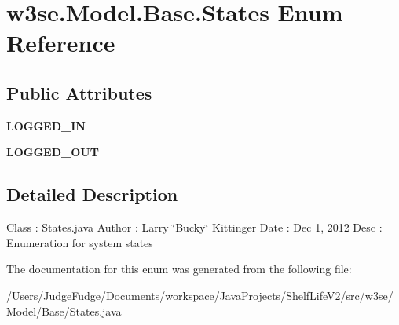 \hypertarget{enumw3se_1_1_model_1_1_base_1_1_states}{\section{w3se.\-Model.\-Base.\-States Enum Reference}
\label{enumw3se_1_1_model_1_1_base_1_1_states}
}
\subsection*{Public Attributes}
\begin{DoxyCompactItemize}
\item 
\hypertarget{enumw3se_1_1_model_1_1_base_1_1_states_ab3bdd8e851d75739426a0ff264c53d87}{{\bfseries L\-O\-G\-G\-E\-D\-\_\-\-I\-N}}\label{enumw3se_1_1_model_1_1_base_1_1_states_ab3bdd8e851d75739426a0ff264c53d87}

\item 
\hypertarget{enumw3se_1_1_model_1_1_base_1_1_states_aadf0d898f94dd406df9a7f8dca9e0968}{{\bfseries L\-O\-G\-G\-E\-D\-\_\-\-O\-U\-T}}\label{enumw3se_1_1_model_1_1_base_1_1_states_aadf0d898f94dd406df9a7f8dca9e0968}

\end{DoxyCompactItemize}


\subsection{Detailed Description}
Class \-: States.\-java Author \-: Larry \char`\"{}\-Bucky\char`\"{} Kittinger Date \-: Dec 1, 2012 Desc \-: Enumeration for system states 

The documentation for this enum was generated from the following file\-:\begin{DoxyCompactItemize}
\item 
/\-Users/\-Judge\-Fudge/\-Documents/workspace/\-Java\-Projects/\-Shelf\-Life\-V2/src/w3se/\-Model/\-Base/States.\-java\end{DoxyCompactItemize}
